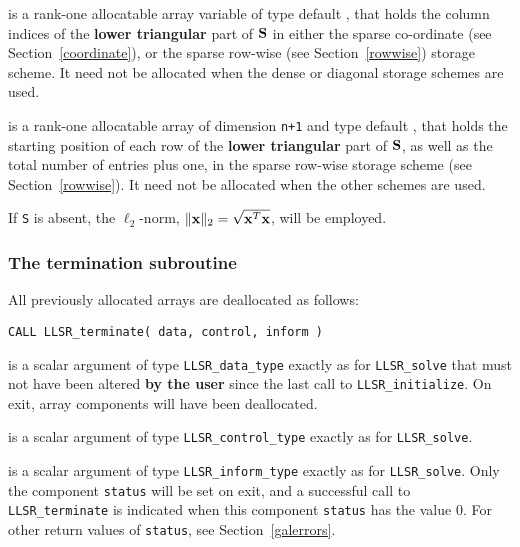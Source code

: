 \documentclass{galahad}
\newcommand{\packagename}{LLSR}
\begin{document}
\begin{description}
\begin{description}
 is a rank-one allocatable array variable of type default \integer,
that holds the column indices of the {\bf lower triangular} part of
${\mathbf{S}}$ in either the sparse co-ordinate
(see Section~\ref{coordinate}), or the sparse row-wise
(see Section~\ref{rowwise}) storage scheme.
It need not be allocated when the dense or diagonal storage schemes are used.

 is a rank-one allocatable array of dimension {\tt n+1} and type
default \integer, that holds the starting position of
each row of the {\bf lower triangular} part of ${\mathbf{S}}$, as well
as the total number of entries plus one, in the sparse row-wise storage
scheme (see Section~\ref{rowwise}). It need not be allocated when the
other schemes are used.

\end{description}
If {\tt S} is absent, the $\ell_2$-norm, $\|{\mathbf{x}}\|_2 = \sqrt{{\mathbf{x}}^T {\mathbf{x}}}$,
will be employed.


\end{description}


\subsubsection{The  termination subroutine}
All previously allocated arrays are deallocated as follows:

\hskip0.5in
{\tt CALL \packagename\_terminate( data, control, inform )}

\begin{description}

 is a scalar \intentinout argument of type
{\tt \packagename\_data\_type}
exactly as for
{\tt \packagename\_solve}
that must not have been altered {\bf by the user} since the last call to
{\tt \packagename\_initialize}.
On exit, array components will have been deallocated.

 is a scalar \intentin argument of type
{\tt \packagename\_control\_type}
exactly as for
{\tt \packagename\_solve}.

 is a scalar \intentout argument of type
{\tt \packagename\_inform\_type}
exactly as for
{\tt \packagename\_solve}.
Only the component {\tt status} will be set on exit, and a
successful call to
{\tt \packagename\_terminate}
is indicated when this  component {\tt status} has the value 0.
For other return values of {\tt status}, see Section~\ref{galerrors}.

\end{description}
\end{document}
